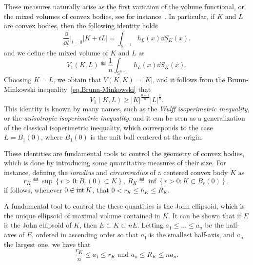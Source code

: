 \documentclass[a4paper, 10pt, twoside]{amsart}
\numberwithin{equation}{section}
\theoremstyle{plain}
\theoremstyle{definition}
\begin{document}
These measures naturally arise as the first variation of the volume functional, or the mixed volumes of convex bodies, see for instance~\cite{boroczky2025isoperimetric}. In particular, if $K$ and $L$ are convex bodies, then the following identity holds
\begin{equation}\label{eq.first_variation_volume} 
    \frac{\dd}{\dd t} \Big|_{t=0} |K + tL| 
    =
    \int_{\mathbb{S}^{n-1}} h_L(x) \dd S_K(x).
\end{equation}
and we define the mixed volume of $K$ and $L$ as
\begin{equation}
    V_1(K,L) 
    \eqdef 
    \frac{1}{n} \int_{\mathbb{S}^{n-1}} h_L(x) \dd S_K(x).
\end{equation}
Choosing $K=L$, we obtain that $V(K,K) = |K|$, and it follows from the Brunn-Minkowski inequality~\eqref{eq.Brunn-Minkowski} that 
\begin{equation}\label{eq.Wulff_inequality}
    V_1(K,L) \ge {|K|}^{\frac{n-1}{n}}{|L|}^{\frac{1}{n}}.
\end{equation}
This identity is known by many names, such as the \textit{Wulff isoperimetric inequality}, or the \textit{anisotropic isoperimetric inequality}, and it can be seen as a generalization of the classical isoperimetric inequality, which corresponds to the case $L = B_1(0)$, where $B_1(0)$ is the unit ball centered at the origin.

These identities are fundamental tools to control the geometry of convex bodies, which is done by introducing some quantitative measures of their size. For instance, defining the \textit{inradius} and \textit{circumradius} of a centered convex body $K$ as 
\begin{equation}\label{eq.in_circum_radii}
        r_K
        \eqdef 
        \sup
        \left\{
            r > 0 : B_r(0) \subset K        
        \right\}, \
        R_K 
        \eqdef 
        \inf
        \left\{
            r > 0 : K \subset B_r(0)        
        \right\},
\end{equation}
if follows, whenever $0 \in \mathop{\rm int} K$, that $0 < r_K \le h_K \le R_K$. 

A fundamental tool to control the these quantities is the John ellipsoid, which is the unique ellipsoid of maximal volume contained in $K$. It can be shown that if $E$ is the John ellipsoid of $K$, then
$
    E \subset K \subset n E.
$ Letting $a_1 \le \dots \le a_n$ be the half-axes of $E$, ordered in ascending order so that $a_1$ is the smallest half-axis, and $a_n$ the largest one, we have that 
\[
        \frac{r_K}{n} \le a_1 \le r_K \text{ and } a_n \le R_K \le n a_n.
\]
\end{document}
